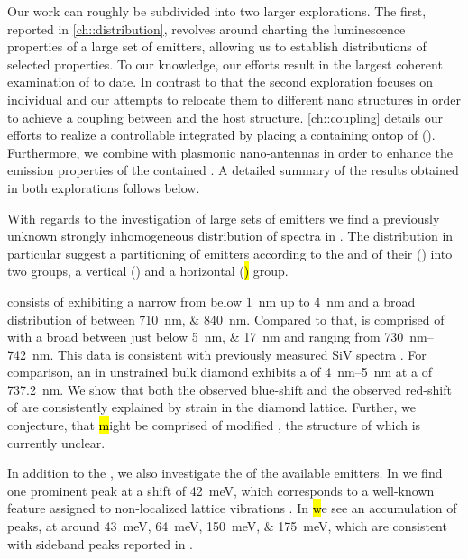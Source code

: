    Our work can roughly be subdivided into two larger explorations. The first, reported in \autoref{ch::distribution}, revolves around charting the luminescence properties of a large set of emitters, allowing us to establish distributions of selected \siv properties. To our knowledge, our efforts result in the largest coherent examination of \sivs to date. In contrast to that the second exploration focuses on individual \nds and our attempts to relocate them to different nano structures in order to achieve a coupling between \sivs and the host structure. \autoref{ch::coupling} details our efforts to realize a controllable integrated \sps by placing a \nd containing \sivs ontop of \vcsel (\VCSEL). Furthermore, we combine \nds with plasmonic nano-antennas in order to enhance the emission properties of the contained \sivs. A detailed summary of the results obtained in both explorations follows below.


   With regards to the investigation of large sets of emitters we find a previously unknown strongly inhomogeneous distribution of \siv spectra in \nds. The distribution in particular suggest a partitioning of emitters according to the \wl and \lw of their \zpls (\ZPL) into two groups, a vertical (\vl) and a horizontal (\hl) group.

   \Hl consists of \ZPLs exhibiting a narrow \lw from below \SI{1}{nm} up to \SI{4}{nm} and a broad distribution of \cwl between \SIlist{710;840}{nm}.
   Compared to that, \vl is comprised of \ZPLs with a broad \lw between just below \SIlist{5; 17}{nm} and \cwl ranging from \SIrange{730}{742}{nm}.
   This data is consistent with previously measured SiV spectra \cite{Benedikter2017a,Neu2012}.
   For comparison, an \siv in unstrained bulk diamond exhibits a \lw of \SIrange{4}{5}{nm} at a \cwl of \SI{737.2}{nm}\cite{Arend2016a,Dietrich2014}.
   We show that both the observed blue-shift and the observed red-shift of \vl are consistently explained by strain in the diamond lattice.
   Further, we conjecture, that \hl might be comprised of modified \sivs, the structure of which is currently unclear.

   In addition to the \zpl, we also investigate the \psb of the available emitters. In \vl we find one prominent peak at a shift of \SI{42}{meV}, which corresponds to a well-known feature assigned to non-localized lattice vibrations \cite{Larkins1971,Sternschulte1994}.
   In \hl we see an accumulation of peaks, at around \SIlist{43;64;150;175}{meV}, which are consistent with sideband peaks reported in \cite{Sternschulte1994,Zaitsev2001,Neu2011}.

